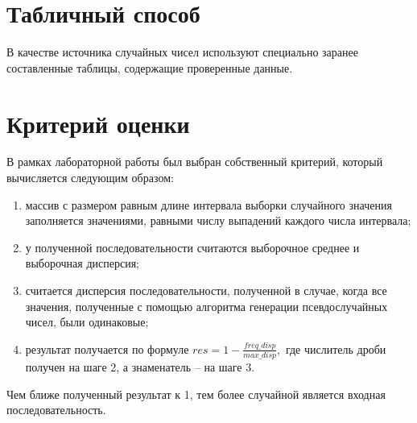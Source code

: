 \section{Табличный способ}
В качестве источника случайных чисел используют специально заранее составленные таблицы, содержащие проверенные данные.

\section{Критерий оценки}
В рамках лабораторной работы был выбран собственный критерий, который вычисляется следующим образом:
\begin{enumerate}
	\item массив с размером равным длине интервала выборки случайного значения заполняется значениями, равными числу выпадений каждого числа интервала;
	\item у полученной последовательности считаются выборочное среднее и выборочная дисперсия;
	\item считается дисперсия последовательности, полученной в случае, когда все значения, полученные с помощью алгоритма генерации псевдослучайных чисел, были одинаковые;
	\item результат получается по формуле $ res = 1 - \frac{freq\_disp}{max\_disp}, $ где числитель дроби получен на шаге 2, а знаменатель -- на шаге 3.
\end{enumerate}

Чем ближе полученный результат к 1, тем более случайной является входная последовательность.